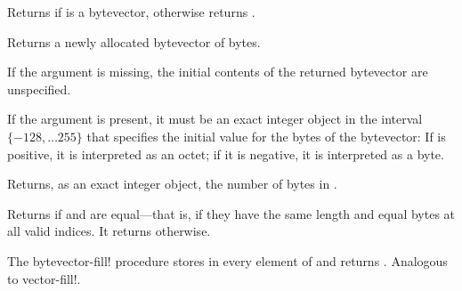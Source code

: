 \begin{entry}{%
}
   
Returns \schtrue{} if  is a bytevector,
otherwise returns \schfalse{}.
\end{entry}

\begin{entry}{%
}
   
Returns a newly allocated bytevector of  bytes.
   
If the  argument is missing, the initial contents of the
returned bytevector are unspecified.
   
If the  argument is present, it must be an exact integer
object in
the interval $\{-128, \ldots 255\}$ that specifies the initial value
for the bytes of the bytevector: If  is positive, it is
interpreted as an octet; if it is negative, it is interpreted as a byte.
\end{entry}   

\begin{entry}{%
}
   
Returns, as an exact integer object, the number of bytes in .
\end{entry}

\begin{entry}{%
}
   
Returns \schtrue{} if  and  are equal---that
is, if they have the same length and equal bytes at all valid indices.
It returns \schfalse{} otherwise.
\end{entry}

\begin{entry}{%
}

The {\cf bytevector-fill!} procedure stores  in every element of 
and returns \unspecifiedreturn.  Analogous to {\cf vector-fill!}.
\end{entry}

